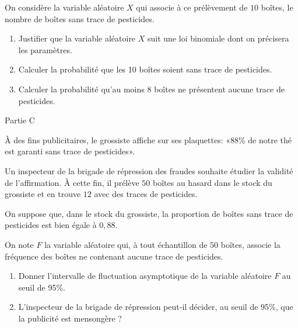 \par
On considère la variable aléatoire $X$ qui associe à ce prélèvement de $10$ boîtes, le nombre de boîtes sans trace de pesticides.
\begin{enumerate}
     \item
     Justifier que la variable aléatoire $X$ suit une loi binomiale dont on précisera les paramètres.
     \item
     Calculer la probabilité que les 10 boîtes soient sans trace de pesticides.
     \item
     Calculer la probabilité qu'au moins $8$ boîtes ne présentent aucune trace de pesticides.
\end{enumerate}
\begin{h3}Partie C\end{h3}
À des fins publicitaires, le grossiste affiche sur ses plaquettes: «88\% de notre thé est garanti sans trace de pesticides».
\par
Un inspecteur de la brigade de répression des fraudes souhaite étudier la validité de l'affirmation. À cette fin, il prélève $50$ boîtes au hasard dans le stock du grossiste et en trouve $12$ avec des traces de pesticides.
\par
On suppose que, dans le stock du grossiste, la proportion de boîtes sans trace de pesticides est bien égale à $0,88$.
\par
On note $F$ la variable aléatoire qui, à tout échantillon de $50$ boîtes, associe la fréquence des boîtes ne contenant aucune trace de pesticides.
\begin{enumerate}
     \item
     Donner l'intervalle de fluctuation asymptotique de la variable aléatoire $F$ au seuil de 95\%.
     \item
L'inspecteur de la brigade de répression peut-il décider, au seuil de 95\%, que la publicité est mensongère ?\end{enumerate}
